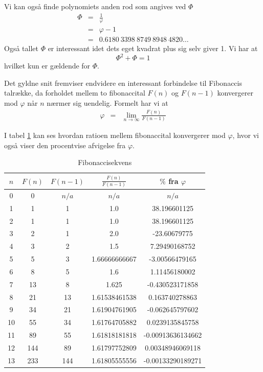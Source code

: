 {Vi kan også finde polynomiets anden rod som angives ved $\varPhi$
\begin{eqnarray*}
	\varPhi & = & \frac{1}{\varphi} \\
		& = & \varphi - 1 \\
		& = & 0.6180\ 3398\ 8749\ 8948\ 4820 \dots
\end{eqnarray*}
Også tallet $\varPhi$ er interessant idet dets eget kvadrat plus sig
selv giver 1. Vi har at
\begin{equation}
	\varPhi^{2} + \varPhi = 1
	\label{Phi_squared}
\end{equation}
hvilket kun er gældende for $\varPhi$.

Det gyldne snit fremviser endvidere en interessant forbindelse til
Fibonaccis talrække, da forholdet mellem to fibonaccital $F(n)$ og $F(n
- 1)$ konvergerer mod $\varphi$ når $n$ nærmer sig uendelig. Formelt har
vi at
\begin{eqnarray*}
	\varphi & =     & \lim_{n \rightarrow\infty}{\frac{F(n)}{F(n - 1)}}
\end{eqnarray*}

I tabel \ref{fibonacci_sequence} kan ses hvordan ratioen mellem
fibonaccital konvergerer mod $\varphi$, hvor vi også viser den
procentvise afvigelse fra $\varphi$.

\begin{table}[h!]
	\begin{center}
		\begin{tabular}{|c|c|c|c|c|}
			\hline
			$n$ & $F(n)$ & $F(n - 1)$ & $ \frac{F(n)}{F(n - 1)}$ & $\%$ fra $\varphi$ \\
			\hline
			0	 & 0 	 & $n/a$ & $n/a$ 		& $n/a$ 		\\
			1	 & 1	 & 1	 & 1.0		 	& 38.196601125 		\\
			2	 & 1	 & 1	 & 1.0		 	& 38.196601125 		\\
			3	 & 2	 & 1	 & 2.0		 	& -23.60679775 		\\
			4	 & 3	 & 2	 & 1.5			& 7.29490168752 	\\
			5	 & 5	 & 3	 & 1.66666666667	& -3.00566479165 	\\
			6	 & 8	 & 5	 & 1.6			& 1.11456180002 	\\
			7	 & 13	 & 8	 & 1.625	 	& -0.430523171858 	\\
			8	 & 21	 & 13	 & 1.61538461538	& 0.163740278863 	\\
			9	 & 34	 & 21	 & 1.61904761905	& -0.062645797602 	\\
			10	 & 55	 & 34	 & 1.61764705882	& 0.0239135845758 	\\
			11	 & 89	 & 55	 & 1.61818181818	& -0.00913636134662 	\\
			12	 & 144	 & 89	 & 1.61797752809	& 0.00348946069118 	\\
			13	 & 233	 & 144	 & 1.61805555556	& -0.00133290189271 	\\
			\hline
		\end{tabular}
	\end{center}
	\caption{Fibonaccisekvens}
	\label{fibonacci_sequence}
\end{table}

}
